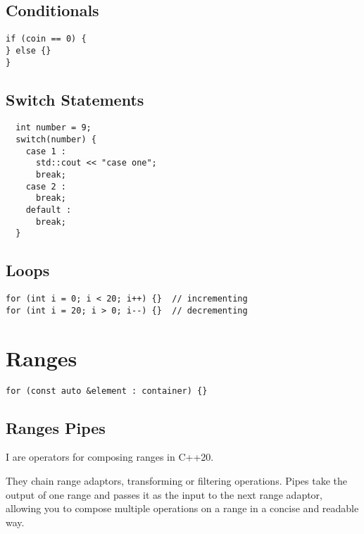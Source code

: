 \subsection{Conditionals}

\begin{verbatim}
if (coin == 0) {
} else {}
}
\end{verbatim}

\subsection{Switch Statements}

\begin{verbatim}
  int number = 9;
  switch(number) {
    case 1 :
      std::cout << "case one";
      break;
    case 2 :
      break;
    default :
      break;
  }
\end{verbatim}

\subsection{Loops}

\begin{verbatim}
for (int i = 0; i < 20; i++) {}  // incrementing
for (int i = 20; i > 0; i--) {}  // decrementing
\end{verbatim}

\section{Ranges}

\begin{verbatim}
for (const auto &element : container) {}
\end{verbatim}

\subsection{Ranges Pipes}

I are operators for composing ranges in C++20.

They chain range adaptors, transforming or filtering operations.
Pipes take the output of one range and passes it as the input to the next range adaptor,
allowing you to compose multiple operations on a range in a concise and readable way.

